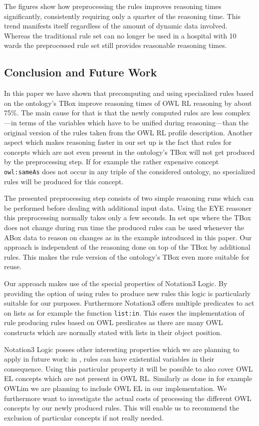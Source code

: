 The figures show how preprocessing the rules improves reasoning times significantly,  consistently requiring only a quarter of the reasoning time.
This trend manifests itself regardless of the amount of dynamic data involved.
Whereas the traditional rule set can no longer be used in a hospital with 10 wards the 
preprocessed rule set still provides reasonable reasoning times. 
  

\subsection{Conclusion and Future Work}\label{conc}
In this paper we have shown that precomputing and using specialized rules based on the ontology's TBox improve reasoning times of OWL RL reasoning by about 75\%. 
The main cause
for that is that 
the newly computed rules are less complex---in terms of the variables which have to be unified during reasoning---than the
original version of the rules taken from the OWL RL 
profile description. 
Another aspect which makes reasoning faster in our set up is the fact that rules for concepts which are not even present in the ontology's TBox will not get 
produced by the preprocessing step. If for example the rather expensive concept \texttt{owl:sameAs} does not occur in any triple of the considered ontology,
no specialized rules will be produced for this concept.


The presented preprocessing step consists of two simple reasoning runs which can be performed before dealing with additional input data. Using the 
EYE reasoner this preprocessing normally takes only a few seconds. In set ups where the TBox does not change during run time the produced rules can be 
used whenever the ABox data to reason on changes as in the example introduced in this paper. Our approach is independent of the  reasoning done on top of the 
TBox by additional rules. This makes the rule version of the ontology's TBox even more suitable for reuse.


Our approach makes use of the special properties of Notation3 Logic.
By providing the option of using rules to produce new rules this logic is particularly suitable for our purposes. Furthermore Notation3 offers
multiple predicates to act on lists as for example the function \texttt{list:in}.
This eases the implementation of rule producing rules based on OWL predicates as there are many OWL constructs which are normally stated with lists 
in their object position.


Notation3 Logic posses other interesting properties which we are planning to apply in future work: in \nthree, rules can have existential variables in their 
consequence.
Using this particular property it will be possible to also cover OWL EL concepts which are not present in OWL RL. Similarly as done in 
for example OWLim \cite{elowlim} we are planning to include OWL EL in our implementation.  We furthermore want to investigate the actual costs of
processing the different OWL concepts by our newly produced rules. This will enable us to recommend the exclusion of particular concepts if not really needed. 


